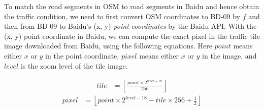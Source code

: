 %

To match the road segments in OSM to road segments in Baidu and hence
obtain the traffic condition, we need to first convert OSM coordinates
to BD-09 by $f$ and then from BD-09 to Baidu's (x, y) 
{\em point coordinates} by the Baidu API. 
%
%
With the (x, y) point coordinate in Baidu,  we can compute the exact
pixel in the traffic tile image downloaded from Baidu, using the following
equations. Here $point$ means either $x$ or $y$ in the point coordinate,
$pixel$ means either $x$ or $y$ in the image,
and $level$ is the zoom level of the tile image.

\begin{align}
tile & = \left \lfloor \frac{point \times 2^{level-18}}{256} \right \rfloor
\end{align}
\begin{align}
pixel &= \left \lfloor point \times 2^{level-18} - tile \times 256 + \frac{1}{2} \right \rfloor
\end{align}

